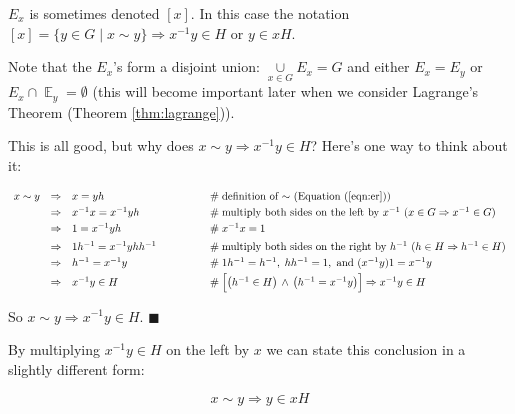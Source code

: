 \documentclass{article}
\theoremstyle{definition}
\DeclareMathOperator{\E}{\mathbb{E}}
\begin{document}
\medskip
\noindent
$E_x$ is sometimes denoted $[x]$.  In this case the notation $[x]
= \{y \in G \mid x \sim y\} \Rightarrow x^{-1}y \in H$ or $y \in
xH$. 

\bigskip
\noindent
Note that the $E_x$'s form a disjoint union: $\underset{x \in
G}{\cup} E_x = G$ and either $E_x = E_y$ or $E_x \cap \E_y =
\emptyset$ (this will become important later when we consider
Lagrange's Theorem (Theorem \ref{thm:lagrange})). 

\bigskip
\noindent
This is all good, but why does $x \sim y \Rightarrow x^{-1}y \in H$?
Here's one way to think about it:


\begin{equation*}
\begin{array}{llll}
x \sim y
&\Rightarrow& x = yh					&\hspace{4em} \mathrel{\#} 
												\text{definition of $\sim$ (Equation (\ref{eqn:er}))} \\
[3pt]
&\Rightarrow& x^{-1}x = x^{-1}yh		&\hspace{4em} \mathrel{\#} 
												\text{multiply both sides on the left by $x^{-1}$ 
												($x \in G \Rightarrow x^{-1} \in G$)} \\
[3pt]
&\Rightarrow& 1 = x^{-1}yh				&\hspace{4em} \mathrel{\#} x^{-1}x = 1 \\
[5pt]
&\Rightarrow& 1h^{-1} = x^{-1}yh h^{-1}	&\hspace{4em} \mathrel{\#} \text{multiply both sides on the right 
												by $h^{-1}$ ($h \in H \Rightarrow h^{-1} \in H$)} \\
[3pt]
&\Rightarrow& h^{-1} = x^{-1}y			&\hspace{4em} \mathrel{\#} 1h^{-1} = h^{-1},\; hh^{-1} = 1,
												\text{ and } (x^{-1}y)1 = x^{-1}y \\
[3pt]
&\Rightarrow& x^{-1}y \in H				&\hspace{4em} \mathrel{\#} \left [ \left ( h^{-1} \in H \right )  \, \land \, 
												\left ( h^{-1} = x^{-1}y \right ) \right ]  \Rightarrow x^{-1}y \in H
\end{array}
\end{equation*}

\smallskip
\noindent
So $x \sim y \Rightarrow x^{-1}y \in H$. $\blacksquare$

\bigskip
\noindent
By multiplying $x^{-1}y \in H$ on the left by $x$ we can state this conclusion 
in a slightly different form: 

\begin{equation*}
x \sim y \Rightarrow y \in xH
\end{equation*}
\end{document}
